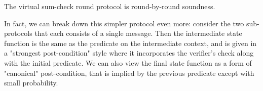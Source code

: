 \begin{theorem}
    The virtual sum-check round protocol is round-by-round soundness.
    \label{thm:virtual_sumcheck_round_protocol_rbr_sound}
\end{theorem}

In fact, we can break down this simpler protocol even more: consider the two sub-protocols that each
consists of a single message. Then the intermediate state function is the same as the predicate on
the intermediate context, and is given in a "strongest post-condition" style where it incorporates
the verifier's check along with the initial predicate. We can also view the final state function as
a form of "canonical" post-condition, that is implied by the previous predicate except with small
probability.
